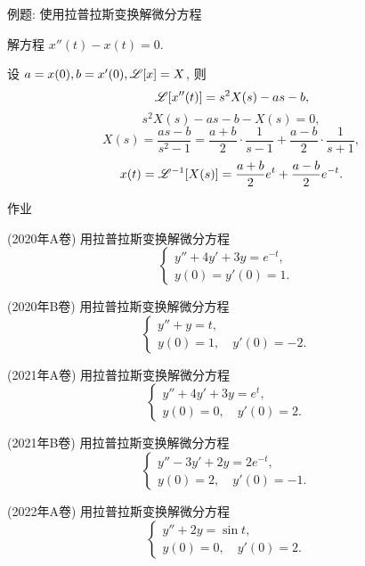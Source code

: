 \begin{frame}{例题: 使用拉普拉斯变换解微分方程}
\begin{example}
解方程 $x''(t)-x(t)=0$.
\end{example}
\begin{solution}
设 $a=x(0),b=x'(0),\mathscr{L}[x]=X$,
\onslide<+->
则
\[\mathscr{L}[x''(t)]=s^2X(s)-as-b,\]
\onslide<+->
\vspace{-\baselineskip}
\[s^2X(s)-as-b-X(s)=0,\]
\onslide<+->
\vspace{-0.8\baselineskip}
\[X(s)=\frac{as-b}{s^2-1}=\frac{a+b}2\cdot\frac1{s-1}+\frac{a-b}2\cdot\frac1{s+1},\]
\onslide<+->
\vspace{-0.8\baselineskip}
\[x(t)=\mathscr{L}^{-1}[X(s)]=\frac{a+b}2e^t+\frac{a-b}2e^{-t}.\]
\end{solution}
\end{frame}

{
\homework
\begin{frame}[<*>]{作业}
  \begin{homeworks}
    \item(2020年A卷) 用拉普拉斯变换解微分方程
    \[\begin{cases}y''+4y'+3y=e^{-t},&\\y(0)=y'(0)=1.\end{cases}\]
    \item(2020年B卷) 用拉普拉斯变换解微分方程
    \[\begin{cases}y''+y=t,&\\y(0)=1,\quad y'(0)=-2.\end{cases}\]
    \item(2021年A卷) 用拉普拉斯变换解微分方程
    \[\begin{cases}y''+4y'+3y=e^t,&\\y(0)=0,\quad y'(0)=2.\end{cases}\]
    \item(2021年B卷) 用拉普拉斯变换解微分方程
    \[\begin{cases}y''-3y'+2y=2e^{-t},&\\y(0)=2,\quad y'(0)=-1.\end{cases}\]
    \item(2022年A卷) 用拉普拉斯变换解微分方程
    \[\begin{cases}y''+2y=\sin t,&\\y(0)=0,\quad y'(0)=2.\end{cases}\]
  \end{homeworks}
\end{frame}
}
